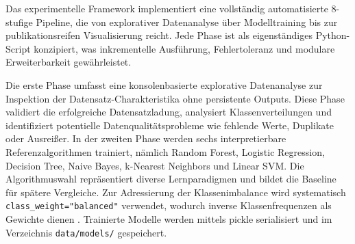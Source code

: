 \documentclass[11pt,a4paper]{article}
\begin{document}

    Das experimentelle Framework implementiert eine vollständig automatisierte 8-stufige Pipeline, die von explorativer Datenanalyse über Modelltraining bis zur publikationsreifen Visualisierung reicht. Jede Phase ist als eigenständiges Python-Script konzipiert, was inkrementelle Ausführung, Fehlertoleranz und modulare Erweiterbarkeit gewährleistet.

    Die erste Phase umfasst eine konsolenbasierte explorative Datenanalyse zur Inspektion der Datensatz-Charakteristika ohne persistente Outputs. Diese Phase validiert die erfolgreiche Datensatzladung, analysiert Klassenverteilungen und identifiziert potentielle Datenqualitätsprobleme wie fehlende Werte, Duplikate oder Ausreißer. In der zweiten Phase werden sechs interpretierbare Referenzalgorithmen trainiert, nämlich Random Forest, Logistic Regression, Decision Tree, Naive Bayes, k-Nearest Neighbors und Linear SVM. Die Algorithmuswahl repräsentiert diverse Lernparadigmen und bildet die Baseline für spätere Vergleiche. Zur Adressierung der Klassenimbalance wird systematisch \texttt{class\_weight="balanced"} verwendet, wodurch inverse Klassenfrequenzen als Gewichte dienen \parencite{Hastie2009}. Trainierte Modelle werden mittels pickle serialisiert und im Verzeichnis \texttt{data/models/} gespeichert.
\end{document}
